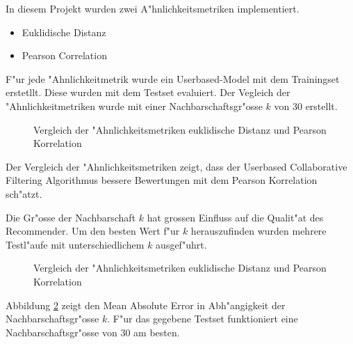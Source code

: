 \documentclass[a4paper, 12pt]{article}
\begin{document}
In diesem Projekt wurden zwei A"hnlichkeitsmetriken implementiert.

\begin{itemize}
\item Euklidische Distanz
\item Pearson Correlation
\end{itemize}

F"ur jede "Ahnlichkeitmetrik wurde ein Userbased-Model mit dem Trainingset erstetllt. Diese wurden mit dem Testset evaluiert. Der Vegleich der "Ahnlichkeitmetriken wurde mit einer Nachbarschaftsgr"osse $k$ von 30 erstellt.

\begin{figure}
  \centering
{}
\label{fig:similarity}
\caption{Vergleich der "Ahnlichkeitsmetriken euklidische Distanz und Pearson Korrelation}
\end{figure}

Der Vergleich der "Ahnlichkeitsmetriken zeigt, dass der Userbased Collaborative Filtering Algorithmus bessere Bewertungen mit dem Pearson Korrelation sch"atzt.

Die Gr"osse der Nachbarschaft $k$ hat grossen Einfluss auf die Qualit"at des Recommender. Um den besten Wert f"ur $k$ herauszufinden wurden mehrere Testl"aufe mit unterschiedlichem $k$ ausgef"uhrt.

\begin{figure}
  \centering
{}
\label{fig:nrofneighbors}
\caption{Vergleich der "Ahnlichkeitsmetriken euklidische Distanz und Pearson Korrelation}
\end{figure}

Abbildung \ref{fig:nrofneighbors} zeigt den Mean Absolute Error in Abh"angigkeit der Nachbarschaftsgr"osse $k$. F"ur das gegebene Testset funktioniert eine Nachbarschaftsgr"osse von 30 am besten.
\end{document}
